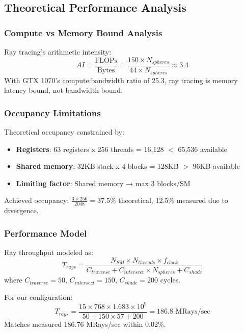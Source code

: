 \documentclass[conference]{IEEEtran}
\begin{document}
\subsection{Theoretical Performance Analysis}

\subsubsection{Compute vs Memory Bound Analysis}
Ray tracing's arithmetic intensity:
\begin{equation}
AI = \frac{\text{FLOPs}}{\text{Bytes}} = \frac{150 \times N_{spheres}}{44 \times N_{spheres}} \approx 3.4
\end{equation}
With GTX 1070's compute:bandwidth ratio of 25.3, ray tracing is memory latency bound, not bandwidth bound.

\subsubsection{Occupancy Limitations}
Theoretical occupancy constrained by:
\begin{itemize}
    \item \textbf{Registers}: 63 registers x 256 threads = 16,128 $<$ 65,536 available
    \item \textbf{Shared memory}: 32KB stack x 4 blocks = 128KB $>$ 96KB available
    \item \textbf{Limiting factor}: Shared memory → max 3 blocks/SM
\end{itemize}
Achieved occupancy: $\frac{3 \times 256}{2048} = 37.5\%$ theoretical, 12.5\% measured due to divergence.

\subsubsection{Performance Model}
Ray throughput modeled as:
\begin{equation}
T_{rays} = \frac{N_{SM} \times N_{threads} \times f_{clock}}{C_{traverse} + C_{intersect} \times N_{spheres} + C_{shade}}
\end{equation}
where $C_{traverse} = 50$, $C_{intersect} = 150$, $C_{shade} = 200$ cycles.

For our configuration:
\begin{equation}
T_{rays} = \frac{15 \times 768 \times 1.683 \times 10^9}{50 + 150 \times 57 + 200} = 186.8 \text{ MRays/sec}
\end{equation}
Matches measured 186.76 MRays/sec within 0.02\%.
\end{document}
